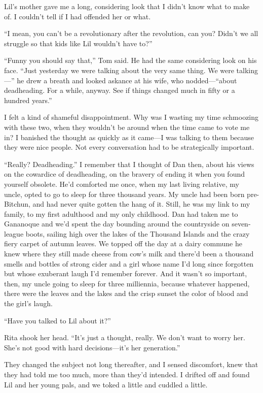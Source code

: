 Lil's mother gave me a long, considering look that I didn't know
what to make of. I couldn't tell if I had offended her or what.

“I mean, you can't be a revolutionary after the revolution, can
you? Didn't we all struggle so that kids like Lil wouldn't have
to?”

“Funny you should say that,” Tom said. He had the same considering
look on his face. “Just yesterday we were talking about the very
same thing. We were talking—” he drew a breath and looked askance
at his wife, who nodded—“about deadheading. For a while, anyway.
See if things changed much in fifty or a hundred years.”

I felt a kind of shameful disappointment. Why was I wasting my time
schmoozing with these two, when they wouldn't be around when the
time came to vote me in? I banished the thought as quickly as it
came—I was talking to them because they were nice people. Not every
conversation had to be strategically important.

“Really? Deadheading.” I remember that I thought of Dan then, about
his views on the cowardice of deadheading, on the bravery of ending
it when you found yourself obsolete. He'd comforted me once, when
my last living relative, my uncle, opted to go to sleep for three
thousand years. My uncle had been born pre-Bitchun, and had never
quite gotten the hang of it. Still, he was my link to my family, to
my first adulthood and my only childhood. Dan had taken me to
Gananoque and we'd spent the day bounding around the countryside on
seven-league boots, sailing high over the lakes of the Thousand
Islands and the crazy fiery carpet of autumn leaves. We topped off
the day at a dairy commune he knew where they still made cheese
from cow's milk and there'd been a thousand smells and bottles of
strong cider and a girl whose name I'd long since forgotten but
whose exuberant laugh I'd remember forever. And it wasn't so
important, then, my uncle going to sleep for three milliennia,
because whatever happened, there were the leaves and the lakes and
the crisp sunset the color of blood and the girl's laugh.

“Have you talked to Lil about it?”

Rita shook her head. “It's just a thought, really. We don't want to
worry her. She's not good with hard decisions—it's her
generation.”

They changed the subject not long thereafter, and I sensed
discomfort, knew that they had told me too much, more than they'd
intended. I drifted off and found Lil and her young pals, and we
toked a little and cuddled a little.

